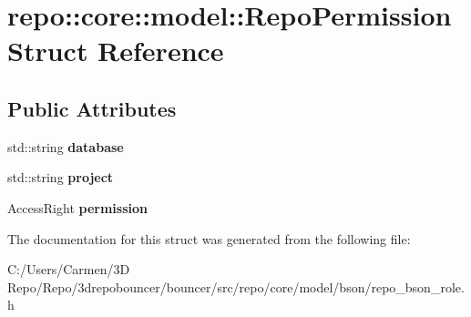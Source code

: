 \hypertarget{structrepo_1_1core_1_1model_1_1_repo_permission}{}\section{repo\+:\+:core\+:\+:model\+:\+:Repo\+Permission Struct Reference}
\label{structrepo_1_1core_1_1model_1_1_repo_permission}
\subsection*{Public Attributes}
\begin{DoxyCompactItemize}
\item 
\hypertarget{structrepo_1_1core_1_1model_1_1_repo_permission_a729698f5134e17dda782c02ba04c4aa2}{}std\+::string {\bfseries database}\label{structrepo_1_1core_1_1model_1_1_repo_permission_a729698f5134e17dda782c02ba04c4aa2}

\item 
\hypertarget{structrepo_1_1core_1_1model_1_1_repo_permission_acedc7f109b755dc5c8f0ff1cd434ed8f}{}std\+::string {\bfseries project}\label{structrepo_1_1core_1_1model_1_1_repo_permission_acedc7f109b755dc5c8f0ff1cd434ed8f}

\item 
\hypertarget{structrepo_1_1core_1_1model_1_1_repo_permission_aacf4a9896fe2dfc690ebea4037da07f9}{}Access\+Right {\bfseries permission}\label{structrepo_1_1core_1_1model_1_1_repo_permission_aacf4a9896fe2dfc690ebea4037da07f9}

\end{DoxyCompactItemize}


The documentation for this struct was generated from the following file\+:\begin{DoxyCompactItemize}
\item 
C\+:/\+Users/\+Carmen/3\+D Repo/\+Repo/3drepobouncer/bouncer/src/repo/core/model/bson/repo\+\_\+bson\+\_\+role.\+h\end{DoxyCompactItemize}
